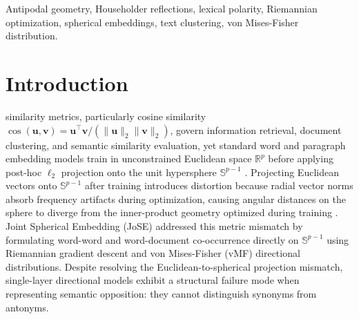 \documentclass[journal]{IEEEtran}
\begin{document}
\begin{IEEEkeywords}
Antipodal geometry, Householder reflections, lexical polarity, Riemannian optimization, spherical embeddings, text clustering, von Mises-Fisher distribution.
\end{IEEEkeywords}

\section{Introduction}
 similarity metrics, particularly cosine similarity $\cos(\mathbf{u}, \mathbf{v}) = \mathbf{u}^\top \mathbf{v} / (\|\mathbf{u}\|_2 \|\mathbf{v}\|_2)$, govern information retrieval, document clustering, and semantic similarity evaluation, yet standard word and paragraph embedding models train in unconstrained Euclidean space $\mathbb{R}^p$ before applying post-hoc $\ell_2$ projection onto the unit hypersphere $\mathbb{S}^{p-1}$ \cite{mikolov2013distributed,pennington2014glove,meng2019spherical}. Projecting Euclidean vectors onto $\mathbb{S}^{p-1}$ after training introduces distortion because radial vector norms absorb frequency artifacts during optimization, causing angular distances on the sphere to diverge from the inner-product geometry optimized during training \cite{meng2019spherical,banerjee2005clustering}. Joint Spherical Embedding (JoSE) \cite{meng2019spherical} addressed this metric mismatch by formulating word-word and word-document co-occurrence directly on $\mathbb{S}^{p-1}$ using Riemannian gradient descent and von Mises-Fisher (vMF) directional distributions. Despite resolving the Euclidean-to-spherical projection mismatch, single-layer directional models exhibit a structural failure mode when representing semantic opposition: they cannot distinguish synonyms from antonyms.
\end{document}
